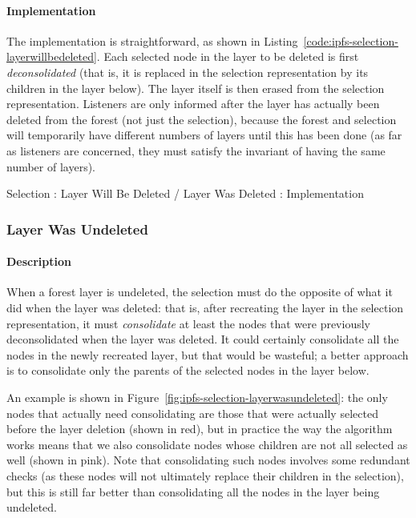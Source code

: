 \paragraph{Implementation}

The implementation is straightforward, as shown in Listing~\ref{code:ipfs-selection-layerwillbedeleted}. Each selected node in the layer to be deleted is first \emph{deconsolidated} (that is, it is replaced in the selection representation by its children in the layer below). The layer itself is then erased from the selection representation. Listeners are only informed after the layer has actually been deleted from the forest (not just the selection), because the forest and selection will temporarily have different numbers of layers until this has been done (as far as listeners are concerned, they must satisfy the invariant of having the same number of layers).

\begin{stulisting}[p]
\caption{Selection : Layer Will Be Deleted / Layer Was Deleted : Implementation}
\label{code:ipfs-selection-layerwillbedeleted}

\end{stulisting}

\afterpage{\clearpage}
\newpage

\subsubsection{Layer Was Undeleted}

\paragraph{Description}

When a forest layer is undeleted, the selection must do the opposite of what it did when the layer was deleted: that is, after recreating the layer in the selection representation, it must \emph{consolidate} at least the nodes that were previously deconsolidated when the layer was deleted. It could certainly consolidate all the nodes in the newly recreated layer, but that would be wasteful; a better approach is to consolidate only the parents of the selected nodes in the layer below.

An example is shown in Figure~\ref{fig:ipfs-selection-layerwasundeleted}: the only nodes that actually need consolidating are those that were actually selected before the layer deletion (shown in red), but in practice the way the algorithm works means that we also consolidate nodes whose children are not all selected as well (shown in pink). Note that consolidating such nodes involves some redundant checks (as these nodes will not ultimately replace their children in the selection), but this is still far better than consolidating all the nodes in the layer being undeleted.

